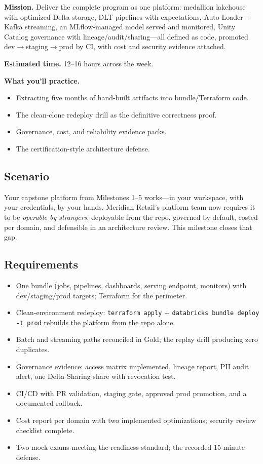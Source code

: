 \begin{capstonebox}
\textbf{Mission.} Deliver the complete program as one platform: medallion lakehouse with optimized Delta storage, DLT pipelines with expectations, Auto Loader + Kafka streaming, an MLflow-managed model served and monitored, Unity Catalog governance with lineage/audit/sharing---all defined as code, promoted dev$\rightarrow$staging$\rightarrow$prod by CI, with cost and security evidence attached.

\textbf{Estimated time.} 12--16 hours across the week.

\textbf{What you'll practice.}
\begin{itemize}
    \item Extracting five months of hand-built artifacts into bundle/Terraform code.
    \item The clean-clone redeploy drill as the definitive correctness proof.
    \item Governance, cost, and reliability evidence packs.
    \item The certification-style architecture defense.
\end{itemize}
\end{capstonebox}

\subsection*{Scenario}
Your capstone platform from Milestones 1--5 works---in your workspace, with your credentials, by your hands. Meridian Retail's platform team now requires it to be \emph{operable by strangers}: deployable from the repo, governed by default, costed per domain, and defensible in an architecture review. This milestone closes that gap.

\subsection*{Requirements}
\begin{itemize}
    \item One bundle (jobs, pipelines, dashboards, serving endpoint, monitors) with dev/staging/prod targets; Terraform for the perimeter.
    \item Clean-environment redeploy: \texttt{terraform apply} + \texttt{databricks bundle deploy -t prod} rebuilds the platform from the repo alone.
    \item Batch and streaming paths reconciled in Gold; the replay drill producing zero duplicates.
    \item Governance evidence: access matrix implemented, lineage report, PII audit alert, one Delta Sharing share with revocation test.
    \item CI/CD with PR validation, staging gate, approved prod promotion, and a documented rollback.
    \item Cost report per domain with two implemented optimizations; security review checklist complete.
    \item Two mock exams meeting the readiness standard; the recorded 15-minute defense.
\end{itemize}

